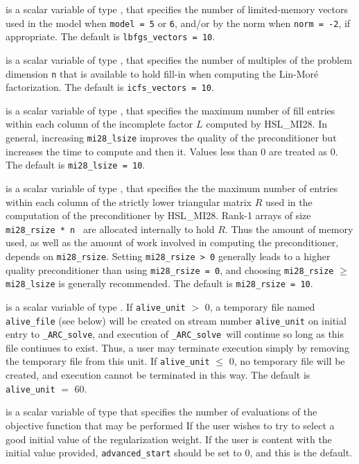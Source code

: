 \documentclass{galahad}
\newcommand{\packagename}{ARC}
\newcommand{\fullpackagename}{\libraryname\_\packagename}
\newcommand{\solver}{{\tt \fullpackagename\_solve}}
\begin{document}
\begin{description}
 is a scalar variable of type \integer,
that specifies the number of limited-memory vectors used in the model
when {\tt model = 5} or {\tt 6},
and/or by the norm when {\tt norm = -2},
if appropriate.
The default is {\tt lbfgs\_vectors = 10}.

 is a scalar variable of type \integer,
that specifies the number of multiples of the problem dimension {\tt n}
that is available to hold fill-in when computing the Lin-Mor\'{e}
factorization.
The default is {\tt icfs\_vectors = 10}.

 is a scalar variable of type \integer,
that specifies the maximum number of fill entries within each column
of the incomplete factor $L$ computed by HSL\_MI28. In general,
increasing {\tt mi28\_lsize} improves the quality of the preconditioner
but increases the time to compute and then it. Values less than 0 are
treated as 0.
The default is {\tt mi28\_lsize = 10}.

 is a scalar variable of type \integer,
that specifies the the maximum number of entries within each column of the
strictly lower triangular matrix $R$ used in the computation of the
preconditioner by HSL\_MI28.  Rank-1 arrays of size {\tt mi28\_rsize * n }
are allocated internally to hold $R$. Thus the amount of memory used, as well
as the amount of work involved in computing the preconditioner, depends on
{\tt mi28\_rsize}. Setting {\tt mi28\_rsize > 0} generally leads to a
higher quality preconditioner than using {\tt mi28\_rsize = 0}, and
choosing {\tt mi28\_rsize} $\geq$ {\tt mi28\_lsize} is generally
recommended.
The default is {\tt mi28\_rsize = 10}.


 is a scalar variable of type \integer.
If {\tt alive\_unit} $>$ 0, a temporary file named {\tt alive\_file} (see below)
will be created on stream number {\tt alive\_unit} on initial entry to
\solver, and execution of \solver\ will continue so
long as this file continues to exist. Thus, a user may terminate execution
simply by removing the temporary file from this unit.
If {\tt alive\_unit} $\leq$ 0, no temporary file will be created, and
execution cannot be terminated in this way.
The default is {\tt alive\_unit} $=$ 60.

 is a scalar variable of type \integer that
specifies the number of evaluations of the objective function that may
be performed If the user wishes to try to select a good initial value of the
regularization weight. If the user is content with the initial value provided,
{\tt advanced\_start} should be set to 0, and this is the default.


\end{description}
\end{document}

